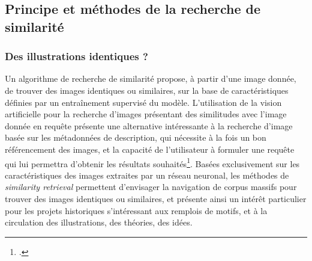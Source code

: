 
\subsection{Principe et méthodes de la recherche de similarité}
    \subsubsection{Des illustrations identiques ?}
    Un algorithme de recherche de similarité propose, à partir d'une image donnée, de trouver des images identiques ou similaires, sur la base de caractéristiques définies par un entraînement supervisé du modèle. L'utilisation de la vision artificielle pour la recherche d'images présentant des similitudes avec l'image donnée en requête présente une alternative intéressante à la recherche d'image basée sur les métadonnées de description, qui nécessite à la fois un bon référencement des images, et la capacité de l'utilisateur à formuler une requête qui lui permettra d'obtenir les résultats souhaités\footcite{farleyImageRetrievalConcepts2023}. Basées exclusivement sur les caractéristiques des images extraites par un réseau neuronal, les méthodes de \textit{similarity retrieval} permettent d'envisager la navigation de corpus massifs pour trouver des images identiques ou similaires, et présente ainsi un intérêt particulier pour les projets historiques s'intéressant aux remplois de motifs, et à la circulation des illustrations, des théories, des idées.
    
